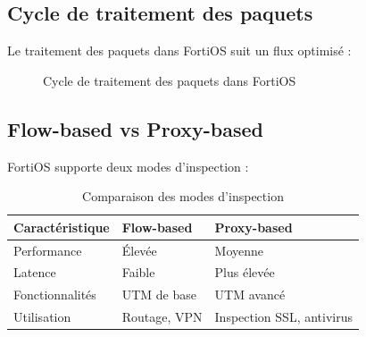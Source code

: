 \subsection{Cycle de traitement des paquets}

Le traitement des paquets dans FortiOS suit un flux optimisé :

\begin{figure}[H]
\centering
{}
\caption{Cycle de traitement des paquets dans FortiOS}
\label{fig:paquet-lifecycle}
\end{figure}

\subsection{Flow-based vs Proxy-based}

FortiOS supporte deux modes d'inspection :

\begin{table}[H]
\centering
\caption{Comparaison des modes d'inspection}
\label{tab:flow-vs-proxy}
\begin{tabularx}{\textwidth}{|l|X|X|}
\hline
\textbf{Caractéristique} & \textbf{Flow-based} & \textbf{Proxy-based} \\
\hline
Performance & Élevée & Moyenne \\
\hline
Latence & Faible & Plus élevée \\
\hline
Fonctionnalités & UTM de base & UTM avancé \\
\hline
Utilisation & Routage, VPN & Inspection SSL, antivirus \\
\hline
\end{tabularx}
\end{table}

